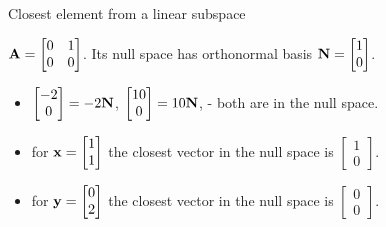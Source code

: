 \documentclass{beamer}
\begin{document}
\begin{frame}{Closest element from a linear subspace}
	\begin{flushleft}
		
		$\mathbf{A} = \begin{bmatrix} 0 & 1 \\ 0 & 0\end{bmatrix}$. Its null space has orthonormal basis $\mathbf{N} = \begin{bmatrix} 1 \\ 0\end{bmatrix}$. 
		
		\begin{itemize}
			\item $\begin{bmatrix} -2 \\ 0 \end{bmatrix} = 
			-2 \mathbf{N}$,
			$\begin{bmatrix} 10 \\ 0 \end{bmatrix} = 
			10 \mathbf{N}$, - both are in the null space.
			\item for $\mathbf{x} = \begin{bmatrix} 1 \\ 1 \end{bmatrix}$ the closest vector in the null space is $\begin{bmatrix} 1 \\ 0 \end{bmatrix}$.
			\item for $\mathbf{y} = \begin{bmatrix} 0 \\ 2 \end{bmatrix}$ the closest vector in the null space is $\begin{bmatrix} 0 \\ 0 \end{bmatrix}$.
		\end{itemize}
		
		
	\end{flushleft}
\end{frame}
\end{document}
